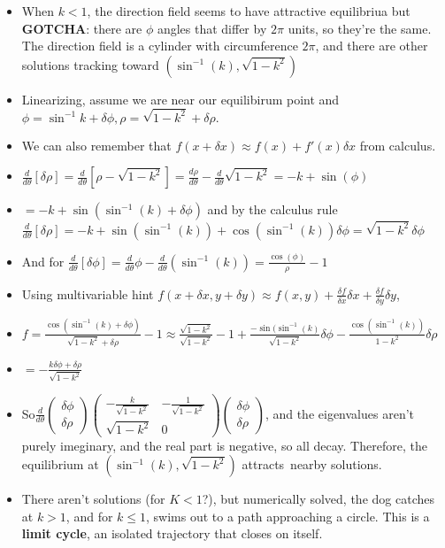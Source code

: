 \documentclass[11pt, oneside]{article}   	%
\begin{document}
\begin{itemize}
\begin{itemize}
\item When $k < 1$, the direction field seems to have attractive equilibriua but \textbf{GOTCHA}: there are $\phi$ angles that differ by $2\pi$ units, so they're the same.  The direction field is a cylinder with circumference $2\pi$, and there are other solutions tracking toward $(\sin^{-1}(k), \sqrt{1-k^2})$
\item Linearizing, assume we are near our equilibirum point and $\phi = \sin^{-1}k + \delta \phi, \rho = \sqrt{1-k^2} + \delta \rho.$
\item We can also remember that $f(x+\delta x) \approx f(x) + f'(x)\delta x$ from calculus.
\item $\frac{d}{d\theta}[\delta \rho] = \frac{d}{d\theta}[\rho - \sqrt{1-k^2}] = \frac{d\rho}{d\theta} - \frac{d}{d\theta}\sqrt{1-k^2} = -k + \sin(\phi)$
\item $= -k + \sin(\sin^{-1}(k) + \delta \phi)$ and by the calculus rule $ \frac{d}{d\theta}[\delta \rho]  = -k + \sin(\sin^{-1}(k)) + \cos(\sin^{-1}(k))\delta \phi = \sqrt{1-k^2}\delta \phi$
\item And for $\frac{d}{d\theta}[\delta \phi] = \frac{d}{d\theta}\phi -  \frac{d}{d\theta} (\sin^{-1}(k)) = \frac{\cos(\phi)}{\rho} - 1$
\item Using multivariable hint $f(x + \delta x, y + \delta y) \approx f(x,y) + \frac{\delta f}{\delta x}\delta x +  \frac{\delta f}{\delta y}\delta y$,
\item $f = \frac{\cos(\sin^{-1}(k) + \delta \phi)}{\sqrt{1-k^2} + \delta \rho} -1  \approx \frac{\sqrt{1-k^2}}{\sqrt{1-k^2}} - 1 + \frac{-\sin(\sin^{-1}(k)}{\sqrt{1-k^2}} \delta \phi - \frac{\cos(\sin^{-1}(k))}{1-k^2} \delta \rho$
\item $=-\frac{k\delta \phi + \delta \rho}{\sqrt{1-k^2}}$
\item So$ \frac{d}{d\theta}\begin{pmatrix} \delta \phi \\ \delta \rho \end{pmatrix} \begin{pmatrix} -\frac{k}{\sqrt{1-k^2}} &-\frac{1}{\sqrt{1-k^2}} \\ \sqrt{1-k^2} & 0  \end{pmatrix} \begin{pmatrix} \delta \phi \\ \delta \rho \end{pmatrix}$, and the eigenvalues aren't purely imeginary, and the real part is negative, so all decay.  Therefore, the equilibrium at $(\sin^{-1}(k), \sqrt{1-k^2})$ attracts\ nearby solutions.
\item There aren't solutions (for $K < 1$?), but numerically solved, the dog catches at $k > 1$, and for $k \leq 1$, swims out to a path approaching a circle.  This is a \textbf{limit cycle}, an isolated trajectory that closes on itself.

\end{itemize}
\end{itemize}
\end{document}
